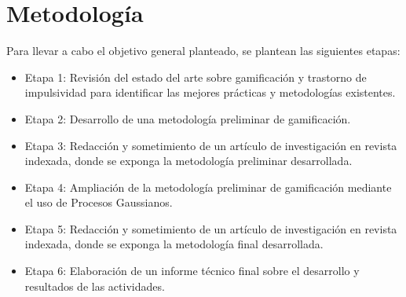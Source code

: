\section{Metodología}
Para llevar a cabo el objetivo general planteado, se plantean las siguientes etapas:
\begin{itemize}
	\item Etapa 1: Revisión del estado del arte sobre gamificación y trastorno de impulsividad para identificar las mejores prácticas y metodologías existentes.
	\item Etapa 2: Desarrollo de una metodología preliminar de gamificación.
	\item Etapa 3: Redacción y sometimiento de un artículo de investigación en revista indexada, donde se exponga la metodología preliminar desarrollada.
	\item Etapa 4: Ampliación de la metodología preliminar de gamificación mediante el uso de Procesos Gaussianos.
	\item Etapa 5: Redacción y sometimiento de un artículo de investigación en revista indexada, donde se exponga la metodología final desarrollada.
	\item Etapa 6: Elaboración de un informe técnico final sobre el desarrollo y resultados de las actividades.
\end{itemize}